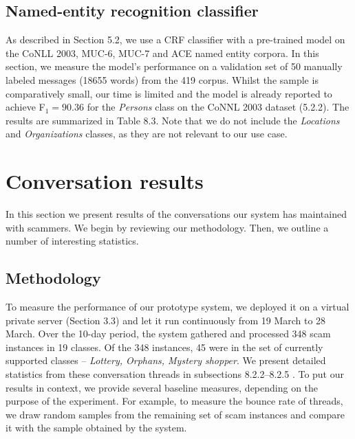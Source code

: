\subsection{Named-entity recognition classifier}
As described in Section 5.2, we use a CRF classifier with a pre-trained model on the CoNLL 2003, MUC-6, MUC-7 and ACE named entity corpora. In this section, we measure the model's performance on a validation set of 50 manually labeled messages (18655 words) from the 419 corpus. Whilst the sample is comparatively small, our time is limited and the model is already reported to achieve F$_{1} = 90.36$ for the \emph{Persons} class on the CoNNL 2003 dataset (5.2.2). The results are summarized in Table 8.3. Note that we do not include the \emph{Locations} and \emph{Organizations} classes, as they are not relevant to our use case.
\begin{table}[h]
  \centering
{}
\caption{Named-entity recognition using Stanford NER 3 class model}
\end{table}

\clearpage
\section{Conversation results}
In this section we present results of the conversations our system has maintained with scammers. We begin by reviewing our methodology. Then, we outline a number of interesting statistics.

\subsection{Methodology}
To measure the performance of our prototype system, we deployed it on a virtual private server (Section 3.3) and let it run continuously from 19 March to 28 March. Over the 10-day period, the system gathered and processed 348 scam instances in 19 classes. Of the 348 instances, 45 were in the set of currently supported classes -- \textit{Lottery, Orphans, Mystery shopper}. We present detailed statistics from these conversation threads in subsections 8.2.2--8.2.5 . To put our results in context, we provide several baseline measures, depending on the purpose of the experiment. For example, to measure the bounce rate of threads, we draw random samples from the remaining set of scam instances and compare it with the sample obtained by the system.

